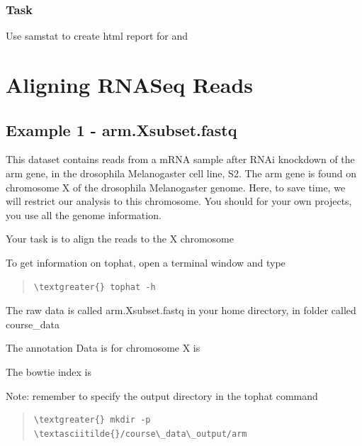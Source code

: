 \documentclass[letterpaper,10pt,english]{sphinxmanual}
\begin{document}
\subsection{Task}
\label{STEP1_QualityControl:id1}
Use samstat to create html report for  and 


\chapter{Aligning RNASeq Reads}
\label{STEP2_alignRNASeqReads::doc}\label{STEP2_alignRNASeqReads:aligning-rnaseq-reads}

\section{Example 1 - arm.Xsubset.fastq}
\label{STEP2_alignRNASeqReads:example-1-arm-xsubset-fastq}
This dataset contains reads from a mRNA sample after RNAi knockdown of the arm gene, in the drosophila Melanogaster cell line, S2. The arm gene is found on chromosome X of the drosophila Melanogaster genome. Here, to save time, we will restrict our analysis to this chromosome. You should for your own projects, you use all the genome information.

Your task is to align the reads to the X chromosome

To get information on tophat, open a terminal window and type
\begin{quote}

\begin{Verbatim}[commandchars=\\\{\}]
\textgreater{} tophat -h
\end{Verbatim}
\end{quote}

The raw data is called arm.Xsubset.fastq in your home directory, in folder called course\_data 

The annotation Data is for chromosome X is 

The bowtie index is 

Note: remember to specify the output directory in the tophat command
\begin{quote}

\begin{Verbatim}[commandchars=\\\{\}]
\textgreater{} mkdir -p \textasciitilde{}/course\_data\_output/arm
\end{Verbatim}
\end{quote}
\end{document}
